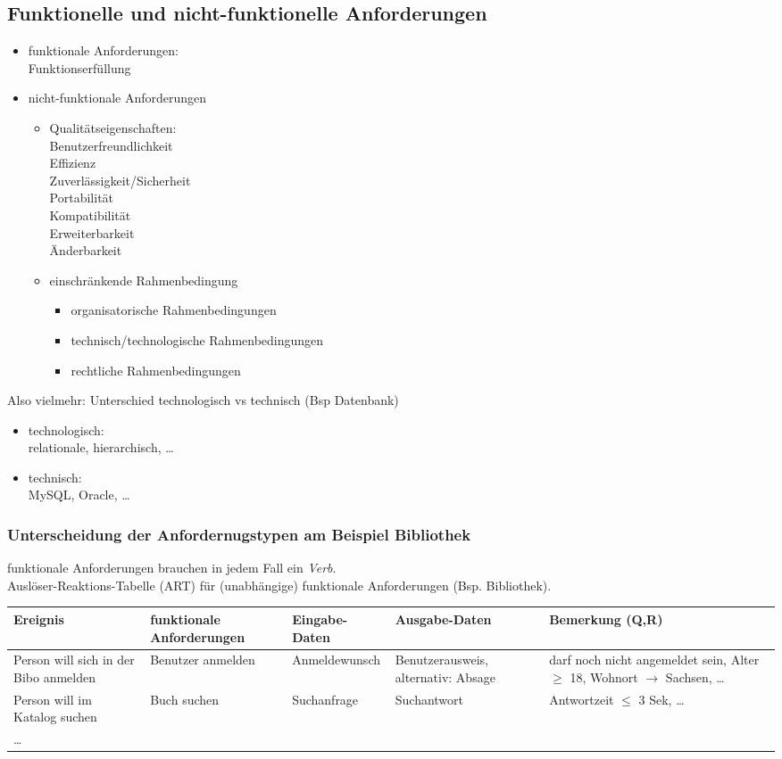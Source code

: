 \subsection{Funktionelle und nicht-funktionelle Anforderungen}
\begin{itemize}
\item funktionale Anforderungen:\\
Funktionserfüllung
\item nicht-funktionale Anforderungen
\begin{itemize}
\item Qualitätseigenschaften:\\
Benutzerfreundlichkeit\\
Effizienz\\
Zuverlässigkeit/Sicherheit\\
Portabilität\\
Kompatibilität\\
Erweiterbarkeit\\
Änderbarkeit
\item einschränkende Rahmenbedingung
\begin{itemize}
\item organisatorische Rahmenbedingungen
\item technisch/technologische Rahmenbedingungen
\item rechtliche Rahmenbedingungen
\end{itemize}
\end{itemize}
\end{itemize}
Also vielmehr:
Unterschied technologisch vs technisch (Bsp Datenbank)
\begin{itemize}
\item technologisch:\\
relationale, hierarchisch, …
\item technisch:\\
MySQL, Oracle, …
\end{itemize}
\subsubsection{Unterscheidung der Anfordernugstypen am Beispiel Bibliothek}
funktionale Anforderungen brauchen in jedem Fall ein \emph{Verb}.\\
Auslöser-Reaktions-Tabelle (ART) für (unabhängige) funktionale Anforderungen (Bsp. Bibliothek).
\begin{tabular}{L{.2} | L{.2} | L{.15} | L{.15} | L{.2}}
Ereignis & funktionale Anforderungen & Eingabe-Daten & Ausgabe-Daten &Bemerkung (Q,R)\\
\hline 
Person will sich in der Bibo anmelden & Benutzer anmelden & Anmeldewunsch & Benutzerausweis, alternativ: Absage & darf noch nicht angemeldet sein, Alter $\geq$ 18, Wohnort $\to$ Sachsen, …\\
\hline 
Person will im Katalog suchen & Buch suchen & Suchanfrage & Suchantwort & Antwortzeit $\leq $ 3 Sek, …\\
\hline 
… &&&&
\end{tabular}

